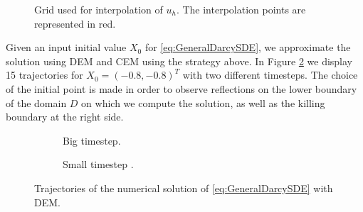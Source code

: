 \begin{figure}[t]
    \centering
    \resizebox{0.8\linewidth}{!}{ }  
    \caption{Grid used for interpolation of $u_h$. The interpolation points are represented in red.}
    \label{fig:GridVelocity}
\end{figure}
\noindent Given an input initial value $X_0$ for \eqref{eq:GeneralDarcySDE}, we approximate the solution using DEM and CEM using the strategy above. In Figure \ref{fig:TrajSDEDarcy} we display 15 trajectories for $X_0 = (-0.8,-0.8)^T$ with two different timesteps. The choice of the initial point is made in order to observe reflections on the lower boundary of the domain $D$ on which we compute the solution, as well as the killing boundary at the right side. 

\begin{figure}[t]
    \centering
    \begin{subfigure}{0.49\linewidth}
        \centering
        \resizebox{1\linewidth}{!}{ }  
        \caption{Big timestep.}
    \end{subfigure}
    \begin{subfigure}{0.49\linewidth}
        \centering
        \resizebox{1\linewidth}{!}{ }  
        \caption{Small timestep .}
    \end{subfigure}    
    \caption{Trajectories of the numerical solution of \eqref{eq:GeneralDarcySDE} with DEM.}
    \label{fig:TrajSDEDarcy}
\end{figure}

